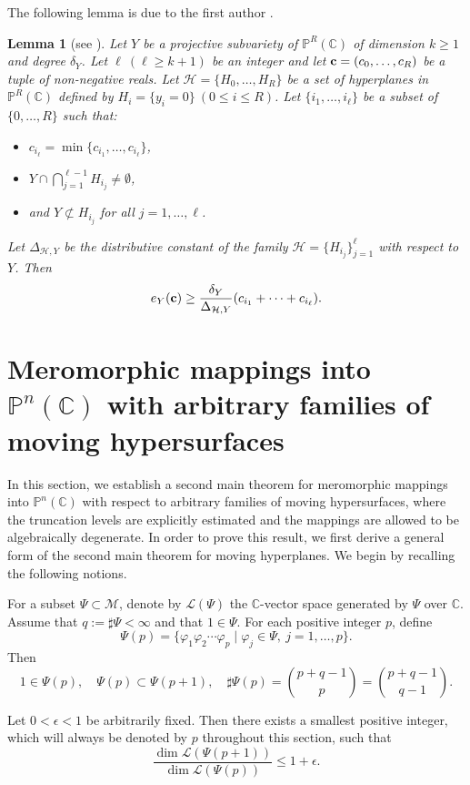 \documentclass[12pt,leqno]{amsart}
\newtheorem{lemma}[equation]{Lemma}
\newcommand{\C}{{\mathbb{C}}}
\renewcommand{\P}{{\mathbb{P}}}
\numberwithin{equation}{section}
\begin{document}
The following lemma is due to the first author \cite{Q22b}.
\begin{lemma}[{see \cite[Lemma 3.2]{Q22b}}]\label{2.2}
Let $Y$ be a projective subvariety of $\P^R(\C)$ of dimension $k\ge 1$ and degree $\delta_Y$. Let $\ell\ (\ell\ge k+1)$ be an integer and let ${\bf c}=(c_0,\ldots,c_R)$ be a tuple of non-negative reals. Let $\mathcal H=\{H_0,\ldots,H_R\}$ be a set of hyperplanes in $\P^R(\C)$ defined by $H_{i}=\{y_{i}=0\}\ (0\le i\le R)$. Let $\{i_1,\ldots, i_\ell\}$ be a subset of $\{0,\ldots,R\}$ such that:
\begin{itemize}
\item[(1)] $c_{i_\ell}=\min\{c_{i_1},\ldots,c_{i_\ell}\}$,
\item[(2)] $Y\cap\bigcap_{j=1}^{\ell-1}H_{i_j}\ne \emptyset$, 
\item[(3)] and $Y\not\subset H_{i_j}$ for all $j=1,\ldots,\ell$.
\end{itemize}
Let $\Delta_{\mathcal H,Y}$ be the distributive constant of the family $\mathcal H=\{H_{i_j}\}_{j=1}^\ell$ with respect to $Y$. Then
$$e_Y({\bf c})\ge \frac{\delta_Y}{\Delta_{\mathcal H,Y}}(c_{i_1}+\cdots+c_{i_\ell}).$$
\end{lemma}

\section{Meromorphic mappings into $\P^n(\C)$ with arbitrary families of moving hypersurfaces}

In this section, we establish a second main theorem for meromorphic mappings into $\P^n(\C)$ with respect to arbitrary families of moving hypersurfaces, where the truncation levels are explicitly estimated and the mappings are allowed to be algebraically degenerate. In order to prove this result, we first derive a general form of the second main theorem for moving hyperplanes. We begin by recalling the following notions.

For a subset $\Psi\subset \mathcal{M}$, denote by $\mathcal L(\Psi)$ the $\C$-vector space generated by $\Psi$ over $\C$. Assume that $q:=\sharp\Psi<\infty$ and that $1\in\Psi$. For each positive integer $p$, define
$$
\Psi(p)=\{\varphi_1\varphi_2\cdots\varphi_p\mid \varphi_j\in\Psi,\ j=1,\ldots,p\}.
$$
Then
$$
1\in\Psi(p),\quad \Psi(p)\subset \Psi(p+1),\quad \sharp\Psi(p)=\binom{p+q-1}{p}=\binom{p+q-1}{q-1}.
$$

Let $0<\epsilon<1$ be arbitrarily fixed. Then there exists a smallest positive integer, which will always be denoted by $p$ throughout this section, such that
$$
\dfrac{\dim \mathcal L(\Psi(p+1))}{\dim \mathcal L(\Psi(p))}\le 1+\epsilon.
$$
\end{document}
